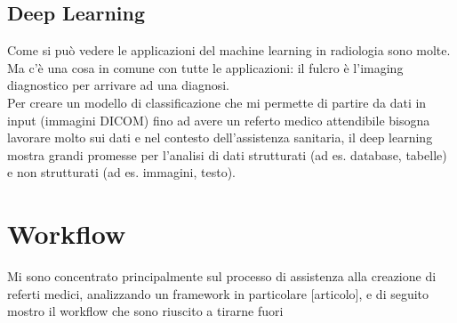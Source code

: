 \documentclass[12pt,a4paper]{report}
\begin{document}
\subsection{Deep Learning}
Come si può vedere le applicazioni del machine learning in radiologia sono molte. Ma c’è una cosa in comune con tutte le applicazioni: il fulcro è l’imaging diagnostico per arrivare ad una diagnosi.\\
Per creare un modello di classificazione che mi permette di partire da dati in input (immagini DICOM) fino ad avere un referto medico attendibile bisogna lavorare molto sui dati e nel contesto dell'assistenza sanitaria, il deep learning mostra grandi promesse per l'analisi di dati strutturati (ad es. database, tabelle) e non strutturati (ad es. immagini, testo).


\section{Workflow}
Mi sono concentrato principalmente sul processo di assistenza alla creazione di referti medici, analizzando un framework in particolare [articolo], e di seguito mostro il workflow che sono riuscito a tirarne fuori
\end{document}
